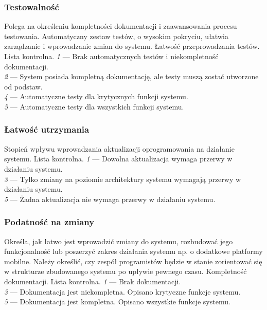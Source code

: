 \documentclass[10pt]{dokument-ppi}
\begin{document}
\subsubsection{Testowalność}
\begin{requirement}
    \desc%
        Polega na określeniu kompletności dokumentacji i zaawansowania
        procesu testowania. Automatyczny zestaw testów, o wysokim
        pokryciu, ułatwia zarządzanie i wprowadzanie zmian do systemu.
    \metric%
        Łatwość przeprowadzania testów.
    \tool%
        Lista kontrolna.
    \scale%
        \emph{1} --- Brak automatycznych testów i niekompletność dokumentacji.\\
        \emph{2} --- System posiada kompletną dokumentację, ale testy muszą zostać utworzone od podstaw.\\
        \emph{4} --- Automatyczne testy dla krytycznych funkcji systemu.\\
        \emph{5} --- Automatyczne testy dla wszystkich funkcji systemu.
\end{requirement}

\subsubsection{Łatwość utrzymania}
\begin{requirement}
    \metric*%
        Stopień wpływu wprowadzania aktualizacji oprogramowania na działanie
        systemu.
    \tool%
        Lista kontrolna.
    \scale%
        \emph{1} --- Dowolna aktualizacja wymaga przerwy w działaniu systemu.\\
        \emph{3} --- Tylko zmiany na poziomie architektury systemu wymagają przerwy w działaniu systemu.\\
        \emph{5} --- Żadna aktualizacja nie wymaga przerwy w działaniu systemu.
\end{requirement}

\subsubsection{Podatność na zmiany}
\begin{requirement}
    \desc%
        Określa, jak łatwo jest wprowadzić zmiany do systemu, rozbudować jego
        funkcjonalność lub poszerzyć zakres działania systemu np. o dodatkowe
        platformy mobilne. Należy określić, czy zespół programistów będzie w
        stanie zorientować się w strukturze zbudowanego systemu po upływie
        pewnego czasu.
    \metric%
        Kompletność dokumentacji.
    \tool%
        Lista kontrolna.
    \scale%
        \emph{1} --- Brak dokumentacji.\\
        \emph{3} --- Dokumentacja jest niekompletna. Opisano krytyczne funkcje systemu.\\
        \emph{5} --- Dokumentacja jest kompletna. Opisano wszystkie funkcje systemu.
\end{requirement}
\end{document}
